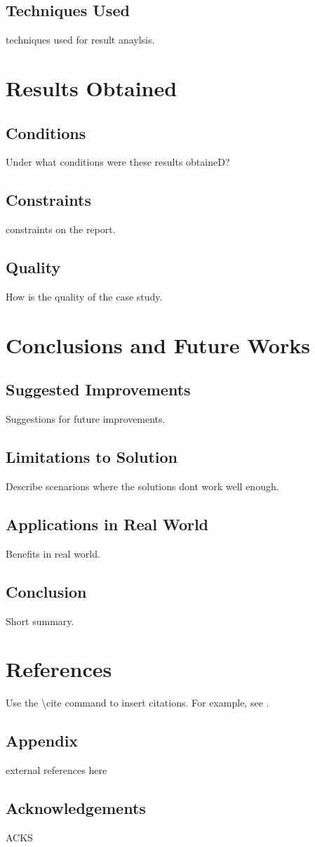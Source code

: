 \documentclass{article}
\begin{document}
\subsection{Techniques Used}
techniques used for result anaylsis.

\section{Results Obtained}
\subsection{Conditions}
Under what conditions were these results obtaineD?

\subsection{Constraints}
constraints on the report.

\subsection{Quality}
How is the quality of the case study.

\section{Conclusions and Future Works}
\subsection{Suggested Improvements}
Suggestions for future improvements.

\subsection{Limitations to Solution}
Describe scenarions where the solutions dont work well enough.

\subsection{Applications in Real World}
Benefits in real world.

\subsection{Conclusion}
Short summary.

\section{References}
Use the \textbackslash cite command to insert citations. For example, see \cite{reference1}.

\subsection{Appendix}
external references here

\subsection{Acknowledgements}
ACKS



\end{document}
